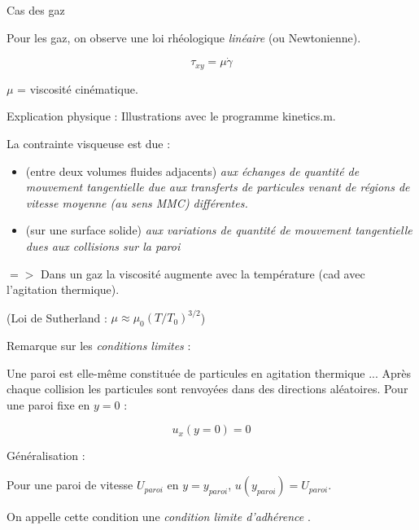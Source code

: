 \begin{frame}{Cas des gaz}

\small
\bigskip

Pour les gaz, on observe une loi rhéologique {\em linéaire } (ou Newtonienne).

$$ \tau_{xy} = \mu \dot{ \gamma} $$

$\mu$ = viscosité cinématique.

\pause
\medskip


Explication physique : Illustrations avec le programme {\sc kinetics.m}.


La contrainte visqueuse est due :

\begin{itemize}
\item
 (entre deux volumes fluides adjacents) {\em aux échanges de quantité de mouvement tangentielle due aux transferts de particules
 venant de régions de vitesse moyenne (au sens MMC) différentes.}
 \item
 (sur une surface solide) {\em aux variations de quantité de mouvement tangentielle dues aux collisions sur la paroi}
\end{itemize}




\pause 
\smallskip 
$=>$  Dans un gaz la viscosité augmente avec la température (cad avec l'agitation thermique). 


(Loi de Sutherland : $\mu \approx \mu_0 (T/T_0)^{3/2}$)





\pause
\medskip
Remarque sur les {\em conditions limites } :

\medskip

Une paroi est elle-même constituée de particules en agitation thermique ... Après chaque collision les particules sont renvoyées
dans des directions aléatoires. 
\smallskip 
Pour une paroi fixe en $y=0$ : 

$$ u_x(y=0) = 0$$ 

Généralisation : 

\smallskip 
Pour une paroi de vitesse $U_{paroi}$ en $y=y_{paroi}$, $u(y_{paroi}) = U_{paroi}$.

On appelle cette condition une {\em condition limite d'adhérence }.


\end{frame}


